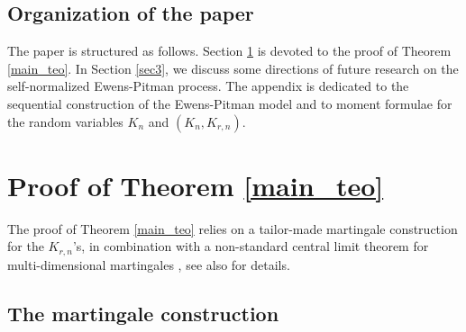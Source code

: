 \documentclass[twoside,12pt]{article}
\begin{document}
\subsection{Organization of the paper}

The paper is structured as follows. Section \ref{sec2} is devoted to the proof of Theorem \ref{main_teo}. In Section \ref{sec3}, we discuss some directions of future research on the self-normalized Ewens-Pitman process. The appendix is dedicated to the sequential construction of the Ewens-Pitman model and to moment formulae for the random variables $K_{n}$ and $(K_{n}, K_{r,n})$.



\section{Proof of Theorem \ref{main_teo}}\label{sec2}
The proof of Theorem \ref{main_teo} relies on a tailor-made martingale construction for the $K_{r,n}$'s, in combination with a non-standard central limit theorem for multi-dimensional martingales \citep{Tou(91),Tou(94)}, see also \citet{Ber(21)} for details.

\subsection{The martingale construction} 
\label{Sub-MC}

\end{document}
